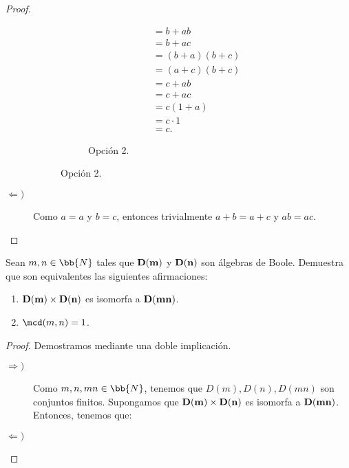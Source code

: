 \begin{ejercicio}
\begin{proof}
\begin{description}
\begin{figure}[H]
\begin{subfigure}[c]{0.4\linewidth}
\begin{align*}
                        &= b+ab\\
                        &= b+ac\\
                        &= (b+a)(b+c)\\
                        &= (a+c)(b+c)\\
                        &= c+ab\\
                        &= c+ac\\
                        &= c(1+a)\\
                        &= c\cdot 1\\
                        &= c.
                    \end{align*}
                    \caption{Opción 2.}
                \end{subfigure}
            \end{figure}

            \item[$\Longleftarrow)$]
            
            Como $a=a$ y $b=c$, entonces trivialmente $a+b=a+c$ y $ab=ac$.
        \end{description}
    \end{proof}
\end{ejercicio}

\begin{ejercicio}
    Sean $m,n\in \bb{N}$ tales que $\bf{D}(m)$ y $\bf{D}(n)$ son álgebras de Boole. Demuestra que son equivalentes las siguientes afirmaciones:
    \begin{enumerate}
        \item $\bf{D}(m)\times \bf{D}(n)$ es isomorfa a $\bf{D}(mn)$.
        \item $\mcd(m,n)=1$.
    \end{enumerate}
    \begin{proof}
        Demostramos mediante una doble implicación.
        \begin{description}
            \item[$\Longrightarrow)$]
            
            Como $m,n,mn\in \bb{N}$, tenemos que $D(m),D(n),D(mn)$ son conjuntos finitos.
            Supongamos que $\bf{D}(m)\times \bf{D}(n)$ es isomorfa a $\bf{D}(mn)$. Entonces, tenemos que:
            
            \item[$\Longleftarrow)$]
        \end{description}
    \end{proof}
\end{ejercicio}


